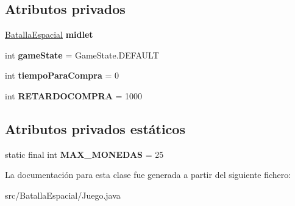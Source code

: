 \subsection*{Atributos privados}
\begin{DoxyCompactItemize}
\item 
\hypertarget{classBatallaEspacial_1_1Juego_a9472677eba5ef5c4f445413945ffc6ee}{
\hyperlink{classBatallaEspacial_1_1BatallaEspacial}{BatallaEspacial} {\bfseries midlet}}
\label{classBatallaEspacial_1_1Juego_a9472677eba5ef5c4f445413945ffc6ee}

\item 
\hypertarget{classBatallaEspacial_1_1Juego_a35456e547588c91168ae8ded67b0f5de}{
int {\bfseries gameState} = GameState.DEFAULT}
\label{classBatallaEspacial_1_1Juego_a35456e547588c91168ae8ded67b0f5de}

\item 
\hypertarget{classBatallaEspacial_1_1Juego_ab095346595193ceaee5b64def317dcd3}{
int {\bfseries tiempoParaCompra} = 0}
\label{classBatallaEspacial_1_1Juego_ab095346595193ceaee5b64def317dcd3}

\item 
\hypertarget{classBatallaEspacial_1_1Juego_a90ec77ffe29809f5baf5765ecf2f0af4}{
int {\bfseries RETARDOCOMPRA} = 1000}
\label{classBatallaEspacial_1_1Juego_a90ec77ffe29809f5baf5765ecf2f0af4}

\end{DoxyCompactItemize}
\subsection*{Atributos privados estáticos}
\begin{DoxyCompactItemize}
\item 
\hypertarget{classBatallaEspacial_1_1Juego_ab03cdec296abe0f13cf636b641bbd9e4}{
static final int {\bfseries MAX\_\-MONEDAS} = 25}
\label{classBatallaEspacial_1_1Juego_ab03cdec296abe0f13cf636b641bbd9e4}

\end{DoxyCompactItemize}


La documentación para esta clase fue generada a partir del siguiente fichero:\begin{DoxyCompactItemize}
\item 
src/BatallaEspacial/Juego.java\end{DoxyCompactItemize}
